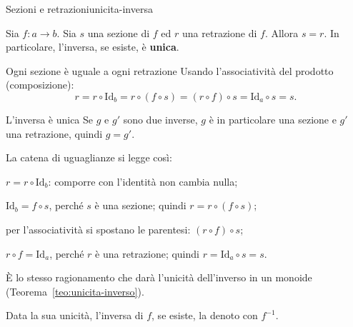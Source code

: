 \begin{concetto}
\begin{Teorema}{Sezioni e retrazioni}{unicita-inversa}
    \begin{prerequisiti}
    \end{prerequisiti}
    Sia $f \colon a \to b$. Sia $s$ una sezione di $f$ ed $r$ una retrazione di $f$. Allora $s = r$.
    In particolare, l'inversa, se esiste, è \textbf{unica}.
\end{Teorema}
\begin{dimostrazione}
    \begin{caso}{Ogni sezione è uguale a ogni retrazione}
        Usando l'associatività del prodotto (composizione):
        \[ r = r \circ \mathrm{Id}_b = r \circ (f \circ s) = (r \circ f) \circ s = \mathrm{Id}_a \circ s = s. \]
    \end{caso}
    \begin{caso}{L'inversa è unica}
        Se $g$ e $g'$ sono due inverse, $g$ è in particolare una sezione e $g'$ una retrazione, quindi $g = g'$.
    \end{caso}
\end{dimostrazione}
\end{concetto}

\begin{spiegazione}
    La catena di uguaglianze si legge così:
    \begin{passi}
        \item $r = r \circ \mathrm{Id}_b$: comporre con l'identità non cambia nulla;
        \item $\mathrm{Id}_b = f \circ s$, perché $s$ è una sezione; quindi $r = r \circ (f \circ s)$;
        \item per l'associatività si spostano le parentesi: $(r \circ f) \circ s$;
        \item $r \circ f = \mathrm{Id}_a$, perché $r$ è una retrazione; quindi $r = \mathrm{Id}_a \circ s = s$.
    \end{passi}
    È lo stesso ragionamento che darà l'unicità dell'inverso in un monoide (Teorema~\ref{teo:unicita-inverso}).
\end{spiegazione}


Data la sua unicità, l'inversa di $f$, se esiste, la denoto con $f^{-1}$.

